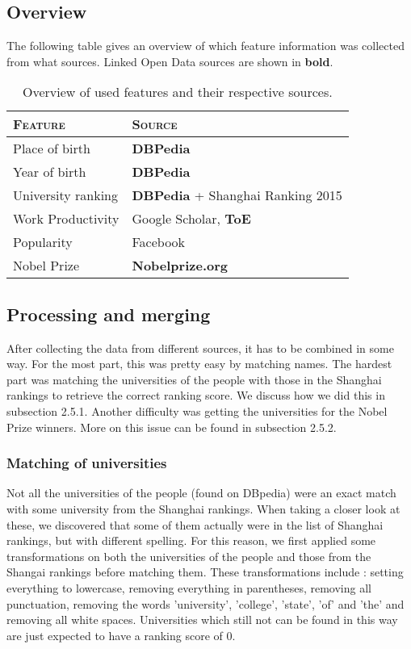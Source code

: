 \subsection{Overview}

The following table gives an overview of which feature information was collected from what sources. Linked Open Data sources are shown in \textbf{bold}.

\begin{table}[H]
\centering
\begin{tabular}{l|l}
	\textbf{\textsc{Feature}} & \textbf{\textsc{Source}} \\ \hline
	\rule{0pt}{4mm}Place of birth & \textbf{DBPedia} \\
	Year of birth & \textbf{DBPedia} \\
	University ranking & \textbf{DBPedia} + Shanghai Ranking 2015\\
	Work Productivity & Google Scholar, \textbf{ToE}\\
	Popularity & Facebook\\
	Nobel Prize& \textbf{Nobelprize.org}
\end{tabular}
\caption{Overview of used features and their respective sources.}
\end{table}

\subsection{Processing and merging}
\label{ssec:merging}
After collecting the data from different sources, it has to be combined in some way. For the most part, this was pretty easy by matching names. The hardest part was matching the universities of the people with those in the Shanghai rankings to retrieve the correct ranking score. We discuss how we did this in subsection 2.5.1.
Another difficulty was getting the universities for the Nobel Prize winners. More on this issue can be found in subsection 2.5.2.

\subsubsection{Matching of universities}
Not all the universities of the people (found on DBpedia) were an exact match with some university from the Shanghai rankings.
When taking a closer look at these, we discovered that some of them actually were in the list of Shanghai rankings, but with different spelling.
For this reason, we first applied some transformations on both the universities of the people and those from the Shangai rankings before matching them. These transformations include : setting everything to lowercase, removing everything in parentheses, removing all punctuation, removing the words 'university', 'college', 'state', 'of' and 'the' and removing all white spaces.
Universities which still not can be found in this way are just expected to have a ranking score of 0.

